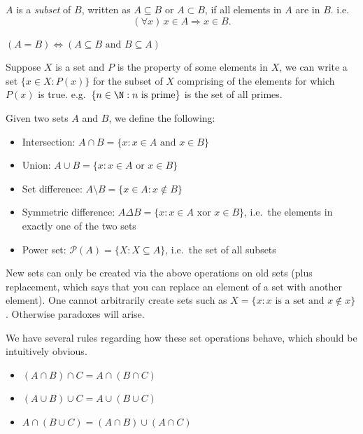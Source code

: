 \documentclass[a4paper]{article}
\begin{document}
\begin{defi}[Subsets]
  $A$ is a \emph{subset} of $B$, written as $A\subseteq B$ or $A\subset B$, if all elements in $A$ are in $B$. i.e.
  \[
    (\forall x)\,x\in A\Rightarrow x\in B.
  \]
\end{defi}

\begin{thm}
  $(A=B)\Leftrightarrow (A\subseteq B \text{ and }B\subseteq A)$
\end{thm}

Suppose $X$ is a set and $P$ is the property of some elements in $X$, we can write a set $\{x\in X:P(x)\}$ for the subset of $X$ comprising of the elements for which $P(x)$ is true. e.g.\ $\{n\in \N : n \text{ is prime}\}$ is the set of all primes.

\begin{defi}
  Given two sets $A$ and $B$, we define the following:
  \begin{itemize}
    \item Intersection: $A\cap B = \{x:x\in A \text{ and } x\in B\}$
    \item Union: $A\cup B = \{x:x\in A\text{ or }x\in B\}$
    \item Set difference: $A\setminus B = \{x\in A: x\not\in B\}$
    \item Symmetric difference: $A\Delta B = \{x: x\in A\text{ xor } x\in B\}$, i.e.\ the elements in exactly one of the two sets
    \item Power set: $\mathcal{P}(A) = \{ X : X\subseteq A\}$, i.e.\ the set of all subsets
  \end{itemize}
\end{defi}

New sets can only be created via the above operations on old sets (plus replacement, which says that you can replace an element of a set with another element). One cannot arbitrarily create sets such as $X=\{x:x\text{ is a set and }x\not\in x\}$. Otherwise paradoxes will arise.

We have several rules regarding how these set operations behave, which should be intuitively obvious.
\begin{prop}\leavevmode
  \begin{itemize}
    \item $(A\cap B)\cap C = A \cap (B\cap C)$
    \item $(A\cup B)\cup C = A\cup (B\cup C)$
    \item $A\cap(B\cup C) = (A\cap B)\cup (A\cap C)$
  \end{itemize}
\end{prop}
\end{document}
